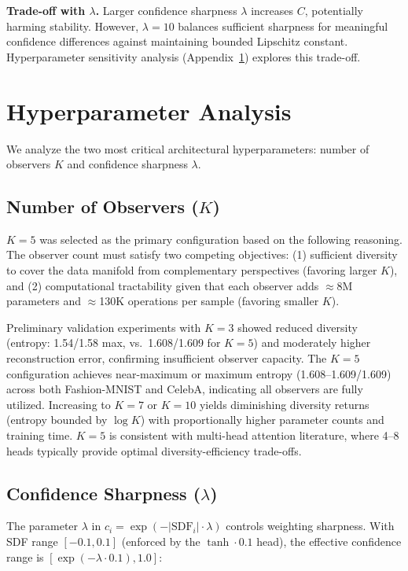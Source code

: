 \documentclass[10pt,twocolumn,letterpaper]{article}
\begin{document}
\textbf{Trade-off with $\lambda$.} Larger confidence sharpness $\lambda$ increases $C$, potentially harming stability. However, $\lambda=10$ balances sufficient sharpness for meaningful confidence differences against maintaining bounded Lipschitz constant. Hyperparameter sensitivity analysis (Appendix~\ref{app:hyperparams}) explores this trade-off.

\section{Hyperparameter Analysis}
\label{app:hyperparams}

We analyze the two most critical architectural hyperparameters: number of observers $K$ and confidence sharpness $\lambda$.

\subsection{Number of Observers ($K$)}

$K=5$ was selected as the primary configuration based on the following reasoning. The observer count must satisfy two competing objectives: (1) sufficient diversity to cover the data manifold from complementary perspectives (favoring larger $K$), and (2) computational tractability given that each observer adds $\approx$8M parameters and $\approx$130K operations per sample (favoring smaller $K$).

Preliminary validation experiments with $K=3$ showed reduced diversity (entropy: 1.54/1.58 max, vs.\ 1.608/1.609 for $K=5$) and moderately higher reconstruction error, confirming insufficient observer capacity. The $K=5$ configuration achieves near-maximum or maximum entropy (1.608--1.609/1.609) across both Fashion-MNIST and CelebA, indicating all observers are fully utilized. Increasing to $K=7$ or $K=10$ yields diminishing diversity returns (entropy bounded by $\log K$) with proportionally higher parameter counts and training time. $K=5$ is consistent with multi-head attention literature, where 4--8 heads typically provide optimal diversity-efficiency trade-offs.

\subsection{Confidence Sharpness ($\lambda$)}

The parameter $\lambda$ in $c_i = \exp(-|\text{SDF}_i| \cdot \lambda)$ controls weighting sharpness. With SDF range $[-0.1, 0.1]$ (enforced by the $\tanh \cdot 0.1$ head), the effective confidence range is $[\exp(-\lambda \cdot 0.1), 1.0]$:
\end{document}

